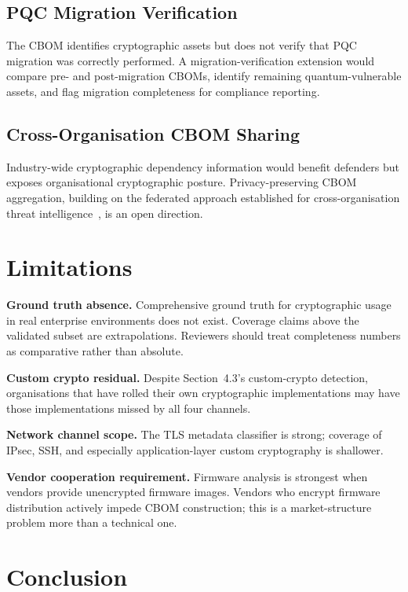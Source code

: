 \documentclass[sigconf,nonacm]{acmart}
\begin{document}
\subsection{PQC Migration Verification}

The CBOM identifies cryptographic assets but does not verify that
PQC migration was correctly performed. A migration-verification
extension would compare pre- and post-migration CBOMs, identify
remaining quantum-vulnerable assets, and flag migration completeness
for compliance reporting.

\subsection{Cross-Organisation CBOM Sharing}

Industry-wide cryptographic dependency information would benefit
defenders but exposes organisational cryptographic posture.
Privacy-preserving CBOM aggregation, building on the federated
approach established for cross-organisation threat
intelligence~\cite{kairouz2024fedml}, is an open direction.

\section{Limitations}

\textbf{Ground truth absence.} Comprehensive ground truth for
cryptographic usage in real enterprise environments does not exist.
Coverage claims above the validated subset are extrapolations.
Reviewers should treat completeness numbers as comparative rather
than absolute.

\textbf{Custom crypto residual.} Despite Section~4.3's custom-crypto
detection, organisations that have rolled their own cryptographic
implementations may have those implementations missed by all four
channels.

\textbf{Network channel scope.} The TLS metadata classifier is
strong; coverage of IPsec, SSH, and especially application-layer
custom cryptography is shallower.

\textbf{Vendor cooperation requirement.} Firmware analysis is
strongest when vendors provide unencrypted firmware images. Vendors
who encrypt firmware distribution actively impede CBOM construction;
this is a market-structure problem more than a technical one.

\section{Conclusion}
\end{document}

